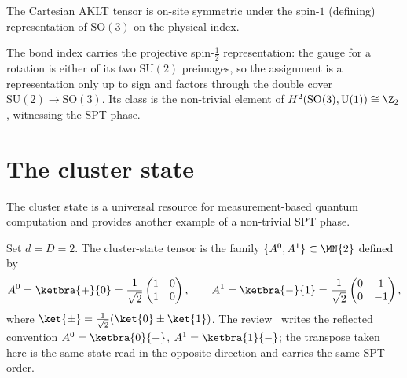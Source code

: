 \begin{theorem}\label{thm:aklt_so3_symmetric}
    \leanok
    The Cartesian AKLT tensor is on-site symmetric under the spin-$1$ (defining)
    representation of $\mathrm{SO}(3)$ on the physical index.
\end{theorem}

\begin{remark}\label{rem:aklt_so3_spt}
    The bond index carries the projective spin-$\tfrac12$ representation: the
    gauge for a rotation is either of its two $\mathrm{SU}(2)$ preimages, so the
    assignment is a representation only up to sign and factors through the double
    cover $\mathrm{SU}(2)\to\mathrm{SO}(3)$.  Its class is the non-trivial element
    of $H^2(\mathrm{SO}(3),\mathrm{U}(1))\cong\Z_2$, witnessing the SPT phase.
\end{remark}

\section{The cluster state}\label{sec:cluster}

The cluster state is a universal resource for measurement-based quantum
computation and provides another example of a non-trivial SPT phase.

\begin{definition}\label{def:cluster_tensor}
    \leanok
    Set $d = D = 2$. The cluster-state tensor is the family
    $\{A^0, A^1\} \subset \MN{2}$ defined by
    \[
        A^0 = \ketbra{+}{0}
        = \frac{1}{\sqrt{2}}
        \begin{pmatrix} 1 & 0 \\ 1 & 0 \end{pmatrix},
        \qquad
        A^1 = \ketbra{-}{1}
        = \frac{1}{\sqrt{2}}
        \begin{pmatrix} 0 & 1 \\ 0 & -1 \end{pmatrix},
    \]
    where $\ket{\pm} = \tfrac{1}{\sqrt{2}}(\ket{0} \pm \ket{1})$.
    The review~\cite{Cirac2021Matrix} writes the reflected convention
    $A^0 = \ketbra{0}{+}$, $A^1 = \ketbra{1}{-}$; the transpose taken
    here is the same state read in the opposite direction and carries the
    same SPT order.
\end{definition}

